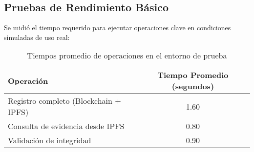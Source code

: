 \subsection{Pruebas de Rendimiento Básico}

Se midió el tiempo requerido para ejecutar operaciones clave en condiciones simuladas de uso real:

\begin{table}[H]
\centering
\begin{tabular}{|l|c|}
\hline
\textbf{Operación} & \textbf{Tiempo Promedio (segundos)} \\
\hline
Registro completo (Blockchain + IPFS) & 1.60 \\
Consulta de evidencia desde IPFS & 0.80 \\
Validación de integridad & 0.90 \\
\hline
\end{tabular}
\caption{Tiempos promedio de operaciones en el entorno de prueba}
\end{table} 